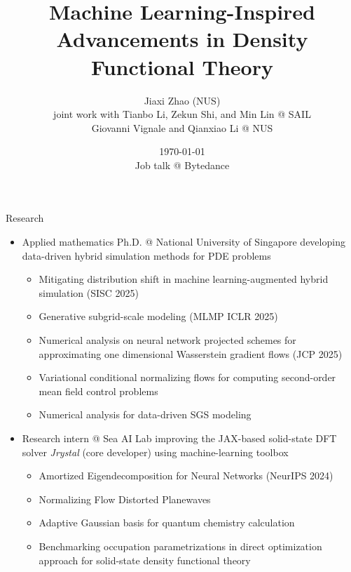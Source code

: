 \documentclass[aspectratio=169]{beamer}
\title[ML4DFT]{Machine Learning-Inspired Advancements in Density Functional Theory}
\author[J. Zhao]{Jiaxi Zhao (NUS) \\ joint work with Tianbo Li, Zekun Shi, and Min Lin
@ SAIL\\
Giovanni Vignale and Qianxiao Li @ NUS}
\date[\today]{\today\\
Job talk @ Bytedance}
\begin{document}

\begin{frame}
\titlepage
\end{frame}


\begin{frame}{Research}
	\begin{itemize}
		\item Applied mathematics Ph.D. @ National University of Singapore
		developing data-driven hybrid simulation methods for PDE problems
		\begin{itemize}
			\item {\scriptsize \color{red} Mitigating distribution shift in machine learning-augmented hybrid simulation (SISC 2025)}
			\item {\scriptsize \color{red} Generative subgrid-scale modeling (MLMP ICLR 2025)}
			\item {\scriptsize Numerical analysis on neural network projected schemes for approximating one dimensional Wasserstein gradient flows (JCP 2025)}
			\item {\scriptsize Variational conditional normalizing flows for computing second-order mean field control problems}
			\item {\scriptsize Numerical analysis for data-driven SGS modeling}
		\end{itemize}
		\item Research intern @ Sea AI Lab improving the JAX-based
		solid-state DFT solver \textit{Jrystal} (core developer) using machine-learning toolbox
		\begin{itemize}
			\item {\scriptsize Amortized Eigendecomposition for Neural Networks (NeurIPS 2024)}
			\item {\scriptsize \color{red} Normalizing Flow Distorted Planewaves}
			\item {\scriptsize \color{red} Adaptive Gaussian basis for quantum chemistry calculation}
			\item {\scriptsize Benchmarking occupation parametrizations in direct optimization approach for solid-state density functional theory}
		\end{itemize}
	\end{itemize}
\end{frame}


\end{document}
